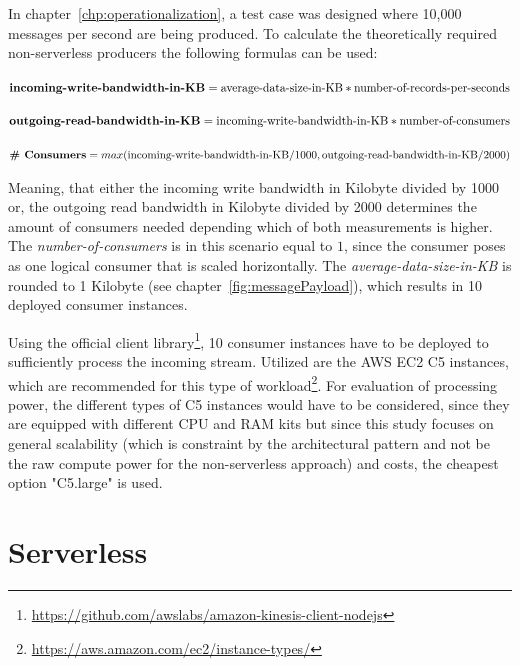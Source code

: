 In chapter~\vref{chp:operationalization}, a test case was designed where 10,000 messages per second are being produced. To calculate the theoretically required non-serverless producers the following formulas\autocite{AmazonFAQs} can be used:

$\textbf{incoming-write-bandwidth-in-KB} = \\
\text{average-data-size-in-KB} * \text{number-of-records-per-seconds}$

$\textbf{outgoing-read-bandwidth-in-KB} = \\
\text{incoming-write-bandwidth-in-KB} * \text{number-of-consumers}$

$\textbf{\# Consumers} = \\
max(\text{incoming-write-bandwidth-in-KB}/1000, \text{outgoing-read-bandwidth-in-KB}/2000)$

Meaning, that either the incoming write bandwidth in Kilobyte divided by 1000 or, the outgoing read bandwidth in Kilobyte divided by 2000 determines the amount of consumers needed depending which of both measurements is higher. The \textit{number-of-consumers} is in this scenario equal to $1$, since the consumer poses as one logical consumer that is scaled horizontally. The \textit{average-data-size-in-KB} is rounded to 1 Kilobyte (see chapter~\vref{fig:messagePayload}), which results in 10 deployed consumer instances. 

Using the official client library\footnote{\url{https://github.com/awslabs/amazon-kinesis-client-nodejs}}, 10 consumer instances have to be deployed to sufficiently process the incoming stream. Utilized are the AWS EC2 C5 instances, which are recommended for this type of workload\footnote{\url{https://aws.amazon.com/ec2/instance-types/}}. For evaluation of processing power, the different types of C5 instances would have to be considered, since they are equipped with different CPU and RAM kits but since this study focuses on general scalability (which is constraint by the architectural pattern and not be the raw compute power for the non-serverless approach) and costs, the cheapest option "C5.large" is used. 


\section{Serverless}\label{chp:protoSL}


